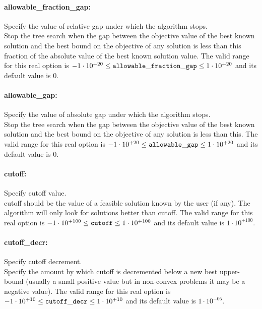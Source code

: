 \paragraph{allowable\_fraction\_gap:}\label{opt:allowable_fraction_gap} Specify the value of relative gap under which the algorithm stops. \\
 Stop the tree search when the gap between the objective value of the best known solution and the best bound on the objective of any solution is less than this fraction of the absolute value of the best known solution value. The valid range for this real option is 
$-1 \cdot 10^{+20} \le {\tt allowable\_fraction\_gap } \le 1 \cdot 10^{+20}$
and its default value is $0$.


\paragraph{allowable\_gap:}\label{opt:allowable_gap} Specify the value of absolute gap under which the algorithm stops. \\
 Stop the tree search when the gap between the objective value of the best known solution and the best bound on the objective of any solution is less than this. The valid range for this real option is 
$-1 \cdot 10^{+20} \le {\tt allowable\_gap } \le 1 \cdot 10^{+20}$
and its default value is $0$.


\paragraph{cutoff:}\label{opt:cutoff} Specify cutoff value. \\
 cutoff should be the value of a feasible solution known by the user (if any). The algorithm will only look for solutions better than cutoff. The valid range for this real option is 
$-1 \cdot 10^{+100} \le {\tt cutoff } \le 1 \cdot 10^{+100}$
and its default value is $1 \cdot 10^{+100}$.


\paragraph{cutoff\_decr:}\label{opt:cutoff_decr} Specify cutoff decrement. \\
 Specify the amount by which cutoff is decremented below a new best upper-bound (usually a small positive value but in non-convex problems it may be a negative value). The valid range for this real option is 
$-1 \cdot 10^{+10} \le {\tt cutoff\_decr } \le 1 \cdot 10^{+10}$
and its default value is $1 \cdot 10^{-05}$.


